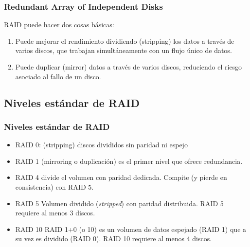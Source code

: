 \documentclass{beamer}
\begin{document}
\begin{frame}
  \frametitle{Redundant Array of Independent Disks}

RAID puede hacer dos cosas básicas:

  \begin{enumerate}
    \item Puede mejorar el rendimiento dividiendo (\alert{stripping}) los datos a través de varios discos, que trabajan simultáneamente con un flujo único de datos.
    \item Puede duplicar (\alert{mirror}) datos a través de varios discos, reduciendo el riesgo asociado al fallo de un disco.
  \end{enumerate}
\end{frame}

\subsection{Niveles estándar de RAID}
\begin{frame}
  \frametitle{Niveles estándar de RAID}

  \begin{itemize}
    \item \alert{RAID 0}: (\alert{stripping}) discos divididos sin paridad ni espejo
    \item \alert{RAID 1} (\alert{mirroring} o duplicación) es el primer nivel que ofrece redundancia.
    \item \alert{RAID 4} divide el volumen con paridad dedicada. Compite (y pierde en consistencia) con RAID 5.
    \item \alert{RAID 5} Volumen dividido (\textit{stripped}) con paridad distribuida. RAID 5 requiere al menos 3 discos.
    \item \alert{RAID 10} RAID 1+0 (o 10) es un volumen de datos espejado (RAID 1) que a su vez es dividido (RAID 0). RAID 10 requiere al menos 4 discos.
  \end{itemize}
\end{frame}
\end{document}
